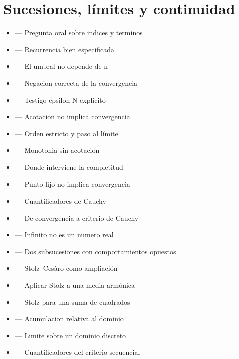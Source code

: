 \documentclass[10pt,a4paper,oneside,openany]{book}
\begin{document}
\section*{Sucesiones, límites y continuidad}
\begin{itemize}
\item {} — Pregunta oral sobre indices y terminos
\item {} — Recurrencia bien especificada
\item {} — El umbral no depende de n
\item {} — Negacion correcta de la convergencia
\item {} — Testigo epsilon-N explicito
\item {} — Acotacion no implica convergencia
\item {} — Orden estricto y paso al límite
\item {} — Monotonia sin acotacion
\item {} — Donde interviene la completitud
\item {} — Punto fijo no implica convergencia
\item {} — Cuantificadores de Cauchy
\item {} — De convergencia a criterio de Cauchy
\item {} — Infinito no es un numero real
\item {} — Dos subsucesiones con comportamientos opuestos
\item {} — Stolz–Cesàro como ampliación
\item {} — Aplicar Stolz a una media armónica
\item {} — Stolz para una suma de cuadrados
\item {} — Acumulacion relativa al dominio
\item {} — Limite sobre un dominio discreto
\item {} — Cuantificadores del criterio secuencial

\end{itemize}
\end{document}
